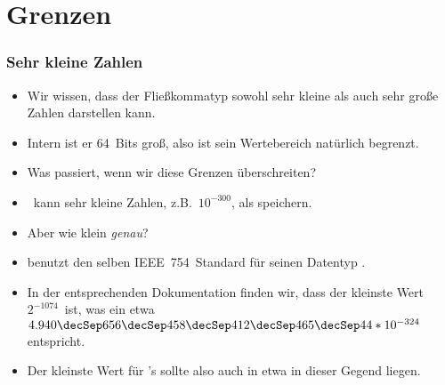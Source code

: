 \documentclass[aspectratio=169,mathserif,notheorems]{beamer}%
\begin{document}
\section{Grenzen}%
%
\begin{frame}%
\frametitle{Sehr kleine Zahlen}%
\begin{itemize}%
\item Wir wissen, dass der Fließkommatyp  sowohl sehr kleine als auch sehr große Zahlen darstellen kann.%
\item<2-> Intern ist er 64~Bits groß, also ist sein Wertebereich natürlich begrenzt.%
\item<3-> Was passiert, wenn wir diese Grenzen überschreiten?%
\item<4-> \python\ kann sehr kleine Zahlen, z.B.~$10^{-300}$, als  speichern.%
\item<5-> Aber wie klein \emph{genau}?%
\item<6->  benutzt den selben IEEE~754~Standard\cite{IEEE2019ISFFPA} für seinen Datentyp .%
\item<7-> In der entsprechenden Dokumentation\cite{O2024JPSEJDKV2AS:CD} finden wir, dass der kleinste Wert $2^{-1074}$~ist, was ein etwa~$4.940\decSep656\decSep458\decSep412\decSep465\decSep44*10^{-324}$ entspricht.%
\item<8-> Der kleinste Wert für \python's  sollte also auch in etwa in dieser Gegend liegen.%
\end{itemize}%
\end{frame}%
%
\end{document}
